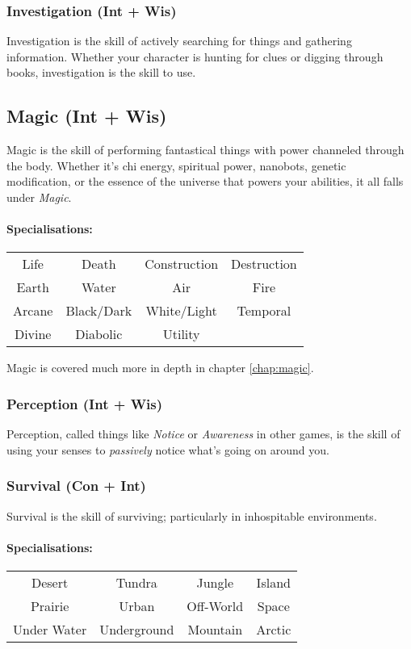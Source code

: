 \subsubsection{Investigation (Int + Wis)}
Investigation is the skill of actively searching for things and gathering information.
Whether your character is hunting for clues or digging through books, investigation is the skill to use.

\subsection{Magic (Int + Wis)}
Magic is the skill of performing fantastical things with power channeled through the body.
Whether it's chi energy, spiritual power, nanobots, genetic modification, or the essence of the universe that powers your abilities, it all falls under \textit{Magic}.

\paragraph{Specialisations:}
\begin{center}
  \begin{tabular}{c|c|c|c}
    Life  & Death & Construction & Destruction \\
    Earth & Water & Air & Fire \\
    Arcane & Black/Dark & White/Light & Temporal \\
    Divine & Diabolic   & Utility
  \end{tabular}
\end{center}
Magic is covered much more in depth in chapter \ref{chap:magic}.

\subsubsection{Perception (Int + Wis)}
Perception, called things like \textit{Notice} or \textit{Awareness} in other games, is the skill of using your senses to \textit{passively} notice what's going on around you.

\subsubsection{Survival (Con + Int)}
Survival is the skill of surviving; particularly in inhospitable environments.

\paragraph{Specialisations:}
\begin{center}
    \begin{tabular}{c|c|c|c}
        Desert & Tundra & Jungle & Island \\
        Prairie & Urban & Off-World & Space \\
        Under Water & Underground & Mountain & Arctic \\
    \end{tabular}
\end{center}

